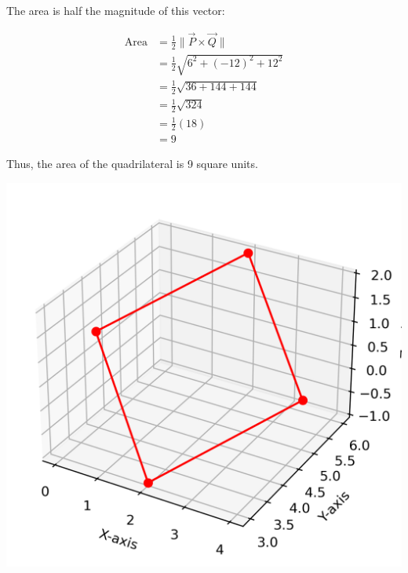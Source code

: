 \documentclass[journal]{IEEEtran}
\begin{document}
The area is half the magnitude of this vector:  

\begin{align*}
\text{Area} &= \frac{1}{2} \|\vec{P} \times \vec{Q}\| \\
&= \frac{1}{2} \sqrt{6^2 + (-12)^2 + 12^2} \\
&= \frac{1}{2} \sqrt{36 + 144 + 144} \\
&= \frac{1}{2} \sqrt{324} \\
&= \frac{1}{2}(18) \\
&= 9
\end{align*}

Thus, the area of the quadrilateral is 9 square units.

\centering
    \includegraphics[width=\columnwidth, height=0.8\textheight, keepaspectratio]{figs/Figure_1.png}
\end{document}
